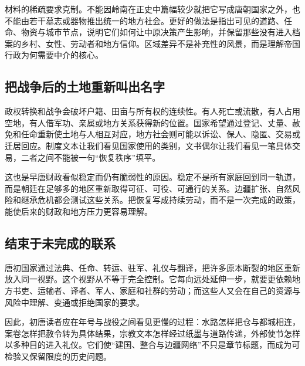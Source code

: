 材料的稀疏要求克制。不能因岭南在正史中篇幅较少就把它写成唐朝国家之外，也不能由若干墓志或器物推出统一的地方社会。更好的做法是指出可见的道路、任命、物资与城市节点，说明它们如何让中原决策产生影响，并保留那些没有进入档案的乡村、女性、劳动者和地方信仰。区域差异不是补充性的风景，而是理解帝国行政为何需要中介的核心。

\subsection{把战争后的土地重新叫出名字}
政权转换和战争会破坏户籍、田亩与所有权的连续性。有人死亡或流散，有人占用空地，有人借军功、亲属或地方关系获得新的位置。国家希望通过登记、丈量、赦免和任命重新使土地与人相互对应，地方社会则可能以诉讼、保人、隐匿、交易或迁居回应。制度文本让我们看见国家使用的类别，文书偶尔让我们看见一笔具体交易，二者之间不能被一句“恢复秩序”填平。

这也是早唐财政看似稳定而仍有脆弱性的原因。稳定不是所有家庭回到同一轨道，而是朝廷在足够多的地区重新取得可征、可役、可通行的关系。边疆扩张、自然风险和继承危机都会测试这些关系。把恢复写成持续劳动，而不是一次完成的政策，能使后来的财政和地方压力更容易理解。

\subsection{结束于未完成的联系}
唐初国家通过法典、任命、转运、驻军、礼仪与翻译，把许多原本断裂的地区重新放入同一视野。这个视野从不等于完全控制。它每向远处延伸一步，就要更依赖地方书吏、运输者、译者、军人、家庭和社群的劳动；而这些人又会在自己的资源与风险中理解、变通或拒绝国家的要求。

因此，初唐读者应在年号与战役之间看见更慢的过程：水路怎样把仓与都城相连，案卷怎样把赦令转为具体结果，宗教文本怎样经过纸墨与道路传递，外部使节怎样以多种目的进入礼仪。它们使“建国、整合与边疆网络”不只是章节标题，而成为可检验又保留限度的历史问题。

